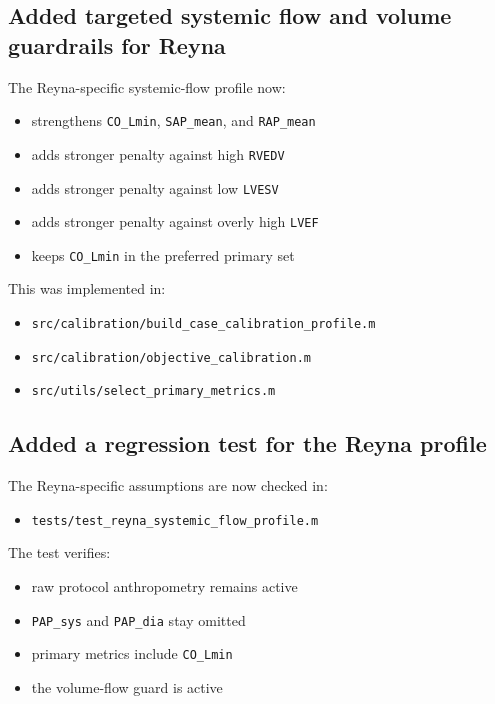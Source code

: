 \documentclass[11pt,a4paper]{article}
\begin{document}
\subsection{Added targeted systemic flow and volume guardrails for Reyna}

The Reyna-specific systemic-flow profile now:

\begin{itemize}[leftmargin=1.5em]
    \item strengthens \texttt{CO\_Lmin}, \texttt{SAP\_mean}, and \texttt{RAP\_mean}
    \item adds stronger penalty against high \texttt{RVEDV}
    \item adds stronger penalty against low \texttt{LVESV}
    \item adds stronger penalty against overly high \texttt{LVEF}
    \item keeps \texttt{CO\_Lmin} in the preferred primary set
\end{itemize}

This was implemented in:

\begin{itemize}[leftmargin=1.5em]
    \item \texttt{src/calibration/build\_case\_calibration\_profile.m}
    \item \texttt{src/calibration/objective\_calibration.m}
    \item \texttt{src/utils/select\_primary\_metrics.m}
\end{itemize}

\subsection{Added a regression test for the Reyna profile}

The Reyna-specific assumptions are now checked in:

\begin{itemize}[leftmargin=1.5em]
    \item \texttt{tests/test\_reyna\_systemic\_flow\_profile.m}
\end{itemize}

The test verifies:

\begin{itemize}[leftmargin=1.5em]
    \item raw protocol anthropometry remains active
    \item \texttt{PAP\_sys} and \texttt{PAP\_dia} stay omitted
    \item primary metrics include \texttt{CO\_Lmin}
    \item the volume-flow guard is active
\end{itemize}
\end{document}
